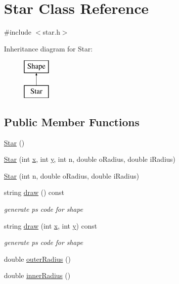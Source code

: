 \hypertarget{class_star}{}\section{Star Class Reference}
\label{class_star}


{\ttfamily \#include $<$star.\+h$>$}

Inheritance diagram for Star\+:\begin{figure}[H]
\begin{center}
\leavevmode
\includegraphics[height=2.000000cm]{class_star}
\end{center}
\end{figure}
\subsection*{Public Member Functions}
\begin{DoxyCompactItemize}
\item 
\hyperlink{class_star_ac174c691c269196c47324a13c3c9f903}{Star} ()
\item 
\hyperlink{class_star_a7f70657eb4be758ec1625e96fbca2133}{Star} (int \hyperlink{class_shape_a41e403e73d2949f1a6adfba6032c41ec}{x}, int \hyperlink{class_shape_ac757f715cc5b5681f2c691663ac06f0a}{y}, int n, double o\+Radius, double i\+Radius)
\item 
\hyperlink{class_star_ac85c92d7f8092da3f5389de37bce8aaa}{Star} (int n, double o\+Radius, double i\+Radius)
\item 
string \hyperlink{class_star_ae0187621a33e5b704f92c77089250316}{draw} () const 
\begin{DoxyCompactList}\small\item\em generate ps code for shape \end{DoxyCompactList}\item 
string \hyperlink{class_star_abb1a219aa29c63205f1e23a056aae521}{draw} (int \hyperlink{class_shape_a41e403e73d2949f1a6adfba6032c41ec}{x}, int \hyperlink{class_shape_ac757f715cc5b5681f2c691663ac06f0a}{y}) const 
\begin{DoxyCompactList}\small\item\em generate ps code for shape \end{DoxyCompactList}\item 
double \hyperlink{class_star_a4bdd108f370f19dc64e9b77df356e1b4}{outer\+Radius} ()
\item 
double \hyperlink{class_star_a35844d0e29a4ad7d5f8ff110832ab31b}{inner\+Radius} ()
\end{DoxyCompactItemize}
